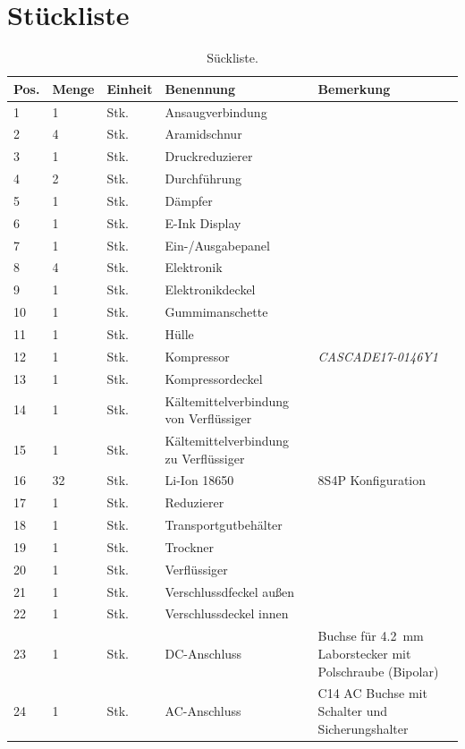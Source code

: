	\section{Stückliste}
		\begin{table}[h]
			\centering
			\caption[Stückliste]{Sückliste.}
			\begin{tabular}[c]{@{}p{.05\textwidth}p{}p{}p{.4\textwidth}p{}@{}}
				\toprule
				Pos. & Menge & Einheit & Benennung & Bemerkung\\
				\midrule
				1&1&Stk.&Ansaugverbindung& \\
				2&4&Stk.&Aramidschnur& \\
				3&1&Stk.&Druckreduzierer& \\
				4&2&Stk.&Durchführung&\\
				5&1&Stk.&Dämpfer&\\
				6&1&Stk.&E-Ink Display& \\
				7&1&Stk.&Ein-/Ausgabepanel& \\
				8&4&Stk.&Elektronik& \\
				9&1&Stk.&Elektronikdeckel& \\
				10&1&Stk.&Gummimanschette& \\
				11&1&Stk.&Hülle&\\
				12&1&Stk.&Kompressor&\textit{CASCADE17-0146Y1}\\
				13&1&Stk.&Kompressordeckel& \\
				14&1&Stk.&Kältemittelverbindung von Verflüssiger& \\
				15&1&Stk.&Kältemittelverbindung zu Verflüssiger& \\
				16&32&Stk.&Li-Ion 18650&8S4P Konfiguration\\
				17&1&Stk.&Reduzierer& \\
				18&1&Stk.&Transportgutbehälter&\\
				19&1&Stk.&Trockner&\\
				20&1&Stk.&Verflüssiger&\\
				21&1&Stk.&Verschlussdfeckel außen&\\
				22&1&Stk.&Verschlussdeckel innen&\\
				23&1&Stk.&DC-Anschluss&Buchse für \SI{4,2}{mm} Laborstecker mit Polschraube (Bipolar)\\
				24&1&Stk.&AC-Anschluss&C14 AC Buchse mit Schalter und Sicherungshalter\\
				\bottomrule
			\end{tabular}
			\label{tab:stueckliste}
		\end{table}